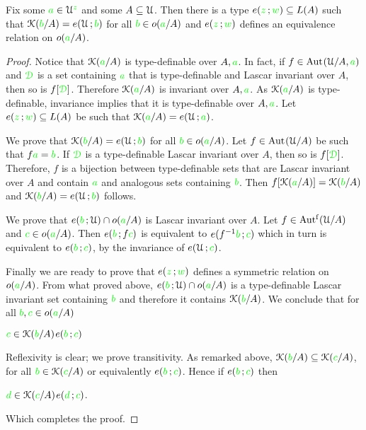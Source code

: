 \begin{proposition}\label{prop_bardotto}
  Fix some ${\color{green} a}\in\EuScript U^{\color{green} z}$ and some $A\subseteq\EuScript U$.
Then there is a type $e({\color{green} z}\,;{\color{green} w})\subseteq L(A)$ such that $\EuScript K({\color{green} b}/A)=e(\EuScript U\,;{\color{green} b})$ for all ${\color{green} b}\in o({\color{green} a}/A)$ and $e({\color{green} z}\,;{\color{green} w})$ defines an equivalence relation on $o({\color{green} a}/A)$.
\end{proposition}

\begin{proof}
  Notice that $\EuScript K({\color{green} a}/A)$ is type-definable over $A,{\color{green} a}$.
  In fact, if $f\in{\rm Aut\kern.15ex}(\EuScript U/A,{\color{green} a})$ and ${\color{green}\EuScript D}$ is a set containing ${\color{green} a}$ that is type-definable and Lascar invariant over $A$, then so is $f[{\color{green}\EuScript D}]$.
  Therefore $\EuScript K({\color{green} a}/A)$ is invariant over $A,{\color{green} a}$.
  As $\EuScript K({\color{green} a}/A)$ is type-definable, invariance implies that it is type-definable over $A,{\color{green} a}$.
  Let $e({\color{green} z}\,;{\color{green} w})\subseteq L(A)$ be such that $\EuScript K({\color{green} a}/A)=e(\EuScript U\,;{\color{green} a})$. 
    
  We prove that $\EuScript K({\color{green} b}/A)=e(\EuScript U\,;{\color{green} b})$ for all ${\color{green} b}\in o({\color{green} a}/A)$.
  Let $f\in{\rm Aut\kern.15ex}(\EuScript U/A)$ be such that $f{\color{green} a}={\color{green} b}$.
  If ${\color{green}\EuScript D}$ is a type-definable Lascar invariant over $A$, then so is $f[{\color{green}\EuScript D}]$.
  Therefore, $f$ is a bijection between type-definable sets that are Lascar invariant over $A$ and contain ${\color{green} a}$ and analogous sets containing ${\color{green} b}$.
  Then $f[\EuScript K({\color{green} a}/A)]=\EuScript K({\color{green} b}/A)$ and $\EuScript K({\color{green} b}/A)=e(\EuScript U\,;{\color{green} b})$ follows.
    
  We prove that $e({\color{green} b}\,;\EuScript U)\cap o({\color{green} a}/A)$ is Lascar invariant over $A$.
  Let $f\in\mbox{Aut$^{\rm f}$}(\EuScript U/A)$ and ${\color{green} c}\in o({\color{green} a}/A)$.
  Then $e({\color{green} b}\,;f{\color{green} c})$ is equivalent to  $e(f^{-1}{\color{green} b}\,;{\color{green} c})$ which in turn is equivalent to $e({\color{green} b}\,;{\color{green} c})$, by the invariance of $e(\EuScript U\,;{\color{green} c})$. 
    
  Finally we are ready to prove that $e({\color{green} z}\,;{\color{green} w})$ defines a symmetric relation on $o({\color{green} a}/A)$.
  From what proved above, $e({\color{green} b}\,;\EuScript U)\cap o({\color{green} a}/A)$ is a type-definable Lascar invariant set containing ${\color{green} b}$ and therefore it contains $\EuScript K({\color{green} b}/A)$.
  We conclude that for all ${\color{green} b},{\color{green} c}\in o({\color{green} a}/A)$
    
  \medrel{\iff}${\color{green} c}\in\EuScript K({\color{green} b}/A)$\medrel{\imp}$e({\color{green} b}\,;{\color{green} c})$
    
  Reflexivity is clear; we prove transitivity.
  As remarked above, $\EuScript K({\color{green} b}/A)\subseteq\EuScript K({\color{green} c}/A)$, for all ${\color{green} b}\in\EuScript K({\color{green} c}/A)$ or equivalently $e({\color{green} b}\,;{\color{green} c})$.
  Hence if $e({\color{green} b}\,;{\color{green} c})$ then
  
  \medrel{\iff}${\color{green} d}\in\EuScript K({\color{green} c}/A)$\medrel{\imp}$e({\color{green} d}\,;{\color{green} c})$.
    
  Which completes the proof.
\end{proof}

